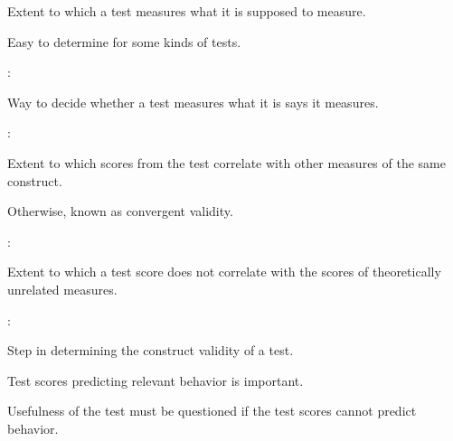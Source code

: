 \begin{coloredlist}
    \item Extent to which a test measures what it is supposed to measure.
    \item Easy to determine for some kinds of tests.
    \item {}:
    \begin{coloredlist}
        \item Way to decide whether a test measures what it is says it measures.
    \end{coloredlist}
    \item {}:
    \begin{coloredlist}
        \item Extent to which scores from the test correlate with other measures of the same construct.
        \item Otherwise, known as convergent validity.
    \end{coloredlist}
    \item {}:
    \begin{coloredlist}
        \item Extent to which a test score does not correlate with the scores of theoretically unrelated measures.
    \end{coloredlist}
    \item {}:
    \begin{coloredlist}
        \item Step in determining the construct validity of a test.
        \item Test scores predicting relevant behavior is important.
        \item Usefulness of the test must be questioned if the test scores cannot predict behavior.
    \end{coloredlist}
\end{coloredlist}